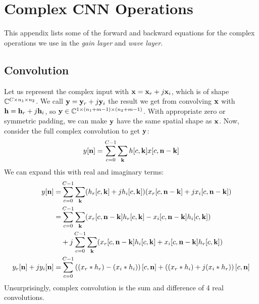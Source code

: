 \chapter{Complex CNN Operations}\label{app:ch6:complex_backprop}
This appendix lists some of the forward and backward equations for the
complex operations we use in the \emph{gain layer} and \emph{wave layer}.

\section{Convolution}\label{sec:appE:complex_conv}
\newcommand{\SigIn}{x}
\newcommand{\SigOut}{y}
\newcommand{\Filter}{h}
\newcommand{\SigInB}{\bmu{\SigIn}}
\newcommand{\SigOutB}{\bmu{\SigOut}}
\newcommand{\FilterB}{\bmu{\Filter}}
\newcommand{\kk}{\bmu{k}}
  
Let us represent the complex input with $\SigInB = \SigInB_r + j\SigInB_i$, which is of shape
$\complexes[C\x n_1\x n_2]$. We call $\SigOutB = \SigOutB_r + j\SigOutB_i$ the result we get from convolving
$\SigInB$ with $\FilterB= \FilterB_r + j\FilterB_i$, so $\SigOutB \in \complexes[1 \x (n_1 + m - 1) \x (n_2 + m -1)]$. With
appropriate zero or symmetric padding, we can make $\SigOutB$ have the same
spatial shape as $\SigInB$. Now, consider the full complex convolution to get
$\SigOutB$:
\begin{equation}
 \SigOut[\nn] = \sum_{c=0}^{C-1} \sum_{\kk} \Filter[c, \kk] \SigIn[c, \nn - \kk]
\end{equation}
We can expand this with real and imaginary terms:
\begin{align}
  \SigOut[\nn]  =&  \sum_{c=0}^{C-1} \sum_{\kk} (\Filter_r[c, \kk] +j\Filter_i[c, \kk]) 
        (\SigIn_r[c, \nn-\kk]+ j\SigIn_i[c, \nn - \kk]) \nonumber \\
  =&  \sum_{c=0}^{C-1} \sum_{\kk} (\SigIn_r[c, \nn - \kk] \Filter_r[c, \kk] - 
                                   \SigIn_i[c, \nn - \kk] \Filter_i[c, \kk]) \nonumber \\
   &+ j\sum_{c=0}^{C-1} \sum_{\kk} (\SigIn_r[c, \nn-\kk] \Filter_i[c, \kk] + 
          \SigIn_i[c, \nn - \kk] \Filter_r[c, \kk]) \nonumber\\
\SigOut_r[\nn] + j\SigOut_i[\nn]  =& \sum_{c=0}^{C-1} \left((\SigIn_r \ast \Filter_r) - (\SigIn_i \ast \Filter_i)\right)[c, \nn] + 
          \left((\SigIn_r \ast \Filter_i) + j(\SigIn_i \ast \Filter_r)\right)[c, \nn] \label{eq:app:complex_conv}
\end{align}
Unsurprisingly, complex convolution is the sum and difference of 4 real convolutions.

